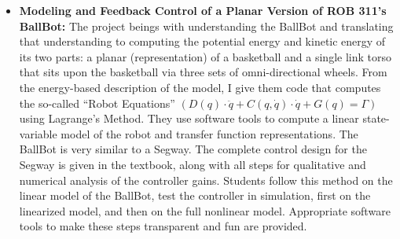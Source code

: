 \documentclass[letterpaper]{book}
\begin{document}
\begin{itemize}
\begin{itemize}
        \item \textbf{Modeling and Feedback Control of a Planar Version of ROB 311's BallBot:} The project beings with understanding the BallBot and translating that understanding to computing the potential energy and kinetic energy of its two parts: a planar (representation) of a basketball and a single link torso that sits upon the basketball via three sets of omni-directional wheels. From the energy-based description of the model, I give them code that computes the so-called ``Robot Equations'' $\left( D(q) \cdot \ddot{q} + C(q, \dot{q}) \cdot \dot{q} + G(q) = \Gamma \right)$ using Lagrange's Method. They use software tools to compute a linear state-variable model of the robot and transfer function representations. The BallBot is very similar to a Segway. The complete control design for the Segway is given in the textbook, along with all steps for qualitative and numerical analysis of the controller gains. Students follow this method on the linear model of the BallBot, test the controller in simulation, first on the linearized model, and then on the full nonlinear model. Appropriate software tools to make these steps transparent and fun are provided. 
    \end{itemize}
\end{itemize}
\end{document}
